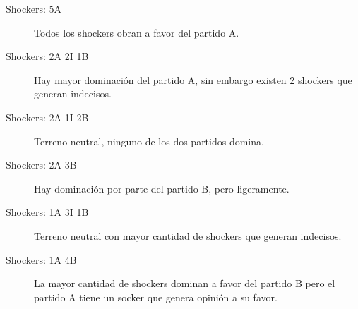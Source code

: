 \begin{description}
    \item[Shockers: 5A] Todos los shockers obran a favor del partido A.
    \item[Shockers: 2A 2I 1B] Hay mayor dominación del partido A, sin embargo existen 2 shockers que generan indecisos.
    \item[Shockers: 2A 1I 2B] Terreno neutral, ninguno de los dos partidos domina.
    \item[Shockers: 2A 3B] Hay dominación por parte del partido B, pero ligeramente.
    \item[Shockers: 1A 3I 1B]Terreno neutral con mayor cantidad de shockers que generan indecisos.
    \item[Shockers: 1A 4B]La mayor cantidad de shockers dominan a favor del partido B pero el partido A tiene un socker que genera opinión a su favor.
    
\end{description}

